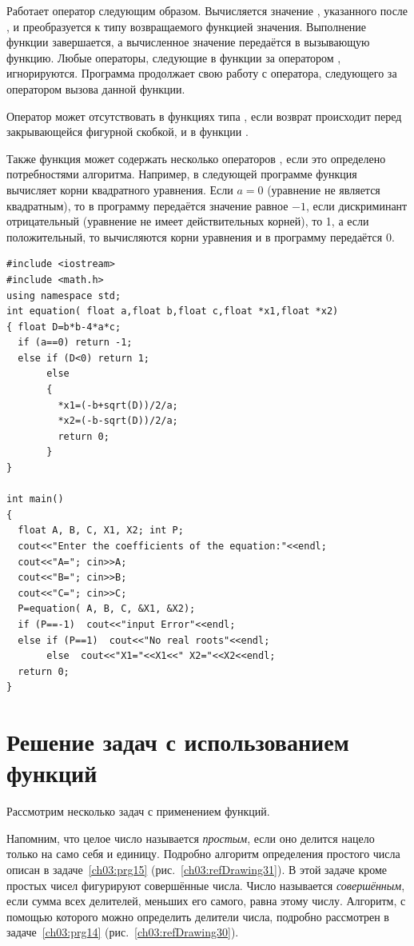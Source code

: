 
Работает оператор следующим образом. Вычисляется значение , указанного после
, и преобразуется к типу возвращаемого функцией значения. Выполнение функции завершается, а
вычисленное значение передаётся в вызывающую функцию. Любые операторы, следующие в функции за оператором
, игнорируются. Программа продолжает свою работу с оператора, следующего за оператором вызова
данной функции.

Оператор  может отсутствовать в функциях типа , если возврат происходит
перед закрывающейся фигурной скобкой, и в функции .

Также функция может содержать несколько операторов , если это определено потребностями
алгоритма. Например, в следующей программе функция  вычисляет корни квадратного уравнения.
Если $a=0$ (уравнение не является квадратным), то в программу передаётся значение равное
$-1$, если дискриминант отрицательный (уравнение не имеет действительных корней), то
1, а если положительный, то  вычисляются корни уравнения и в программу передаётся 0.
\begin{lstlisting}
#include <iostream>
#include <math.h>
using namespace std;
int equation( float a,float b,float c,float *x1,float *x2)
{ float D=b*b-4*a*c;
  if (a==0) return -1;
  else if (D<0) return 1;
       else 
       {
         *x1=(-b+sqrt(D))/2/a;
         *x2=(-b-sqrt(D))/2/a;
         return 0;
       }
}

int main()
{
  float A, B, C, X1, X2; int P;
  cout<<"Enter the coefficients of the equation:"<<endl;
  cout<<"A="; cin>>A;
  cout<<"B="; cin>>B;
  cout<<"C="; cin>>C;
  P=equation( A, B, C, &X1, &X2);
  if (P==-1)  cout<<"input Error"<<endl;
  else if (P==1)  cout<<"No real roots"<<endl;
       else  cout<<"X1="<<X1<<" X2="<<X2<<endl;
  return 0;
}
\end{lstlisting}

\section[Решение задач с использованием функций]{Решение задач с использованием функций}
Рассмотрим несколько задач с применением функций.


Напомним, что целое число называется \emph{простым}, если оно делится нацело только на само себя и единицу.
Подробно алгоритм определения простого числа описан в задаче~\ref{ch03:prg15} (рис.~\ref{ch03:refDrawing31}). 
В этой задаче кроме простых чисел
фигурируют совершённые числа. Число называется \emph{совершённым}, если сумма всех делителей, меньших его
самого, равна этому числу. Алгоритм, с помощью которого можно определить делители числа, подробно рассмотрен 
в задаче~\ref{ch03:prg14} (рис.~\ref{ch03:refDrawing30}).

